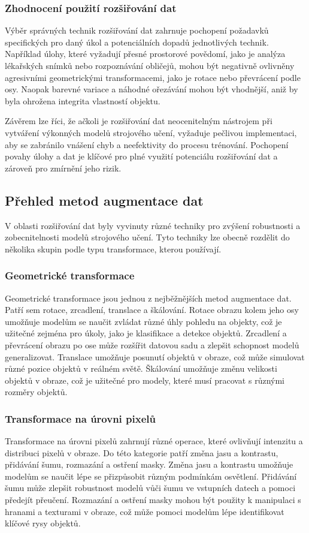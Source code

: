 \documentclass[male,czech,api_ing]{thesis}
\begin{document}
\subsubsection{Zhodnocení použití rozšiřování dat}
Výběr správných technik rozšiřování dat zahrnuje pochopení požadavků specifických pro daný úkol a potenciálních dopadů jednotlivých technik. Například úlohy, které vyžadují přesné prostorové povědomí, jako je analýza lékařských snímků nebo rozpoznávání obličejů, mohou být negativně ovlivněny agresivními geometrickými transformacemi, jako je rotace nebo převrácení podle osy. Naopak barevné variace a náhodné ořezávání mohou být vhodnější, aniž by byla ohrožena integrita vlastností objektu.

Závěrem lze říci, že ačkoli je rozšiřování dat neocenitelným nástrojem při vytváření výkonných modelů strojového učení, vyžaduje pečlivou implementaci, aby se zabránilo vnášení chyb a neefektivity do procesu trénování. Pochopení povahy úlohy a dat je klíčové pro plné využití potenciálu rozšiřování dat a zároveň pro zmírnění jeho rizik.

\subsection{Přehled metod augmentace dat}
V oblasti rozšiřování dat byly vyvinuty různé techniky pro zvýšení robustnosti a zobecnitelnosti modelů strojového učení. Tyto techniky lze obecně rozdělit do několika skupin podle typu transformace, kterou používají.

\subsubsection{Geometrické transformace}
Geometrické transformace jsou jednou z nejběžnějších metod augmentace dat. Patří sem rotace, zrcadlení, translace a škálování. Rotace obrazu kolem jeho osy umožňuje modelům se naučit zvládat různé úhly pohledu na objekty, což je užitečné zejména pro úkoly, jako je klasifikace a detekce objektů. Zrcadlení a převrácení obrazu po ose může rozšířit datovou sadu a zlepšit schopnost modelů generalizovat. Translace umožňuje posunutí objektů v obraze, což může simulovat různé pozice objektů v reálném světě. Škálování umožňuje změnu velikosti objektů v obraze, což je užitečné pro modely, které musí pracovat s různými rozměry objektů. \cite{AugmentationSurvey}

\subsubsection{Transformace na úrovni pixelů}
Transformace na úrovni pixelů zahrnují různé operace, které ovlivňují intenzitu a distribuci pixelů v obraze. Do této kategorie patří změna jasu a kontrastu, přidávání šumu, rozmazání a ostření masky. Změna jasu a kontrastu umožňuje modelům se naučit lépe se přizpůsobit různým podmínkám osvětlení. Přidávání šumu může zlepšit robustnost modelů vůči šumu ve vstupních datech a pomoci předejít přeučení. Rozmazání a ostření masky mohou být použity k manipulaci s hranami a texturami v obraze, což může pomoci modelům lépe identifikovat klíčové rysy objektů. \cite{AugmentationSurvey}
\end{document}
